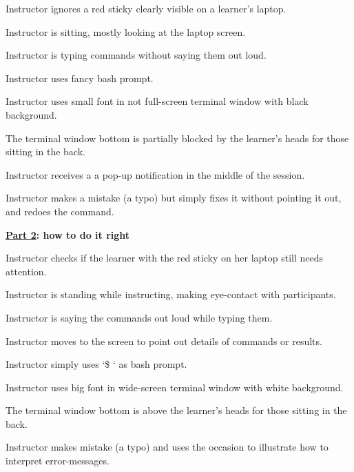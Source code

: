 \begin{gitemize}

\item
  Instructor ignores a red sticky clearly visible on a learner's
  laptop.

\item
  Instructor is sitting, mostly looking at the laptop screen.

\item
  Instructor is typing commands without saying them out loud.

\item
  Instructor uses fancy bash prompt.

\item
  Instructor uses small font in not full-screen terminal window with
  black background.

\item
  The terminal window bottom is partially blocked by the learner's
  heads for those sitting in the back.

\item
  Instructor receives a a pop-up notification in the middle of the
  session.

\item
  Instructor makes a mistake (a typo) but simply fixes it without
  pointing it out, and redoes the command.

\end{gitemize}

\noindent
\textbf{\href{https://youtu.be/SkPmwe\_WjeY}{Part 2}: how to do it right}

\begin{gitemize}

\item
  Instructor checks if the learner with the red sticky on her laptop
  still needs attention.

\item
  Instructor is standing while instructing, making eye-contact with
  participants.

\item
  Instructor is saying the commands out loud while typing them.

\item
  Instructor moves to the screen to point out details of commands or
  results.

\item
  Instructor simply uses `\$ ` as bash prompt.

\item
  Instructor uses big font in wide-screen terminal window with white
  background.

\item
  The terminal window bottom is above the learner's heads for those
  sitting in the back.

\item
  Instructor makes mistake (a typo) and uses the occasion to
  illustrate how to interpret error-messages.

\end{gitemize}

